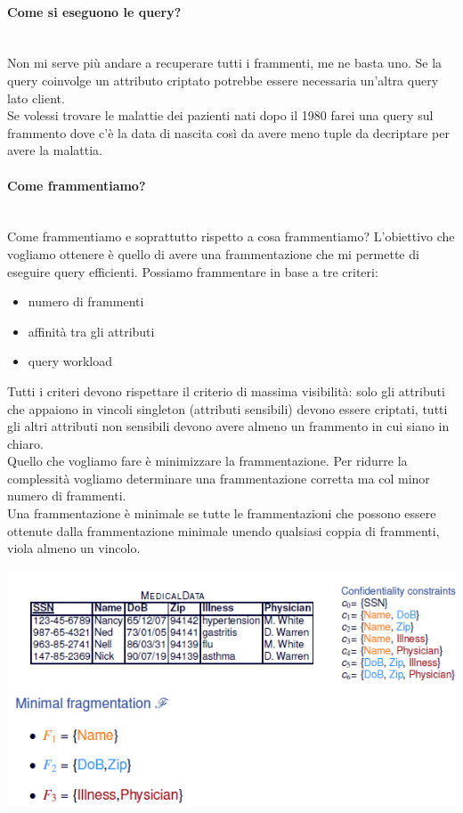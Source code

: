 \paragraph{Come si eseguono le query?}\\
Non mi serve più andare a recuperare tutti i frammenti, me ne basta uno. Se la query coinvolge un attributo criptato potrebbe essere necessaria un'altra query lato client.\\
Se volessi trovare le malattie dei pazienti nati dopo il 1980 farei una query sul frammento dove c'è la data di nascita così da avere meno tuple da decriptare per avere la malattia.

\paragraph{Come frammentiamo?}\\ Come frammentiamo e soprattutto rispetto a cosa frammentiamo? L'obiettivo che vogliamo ottenere è quello di avere una frammentazione che mi permette di eseguire query efficienti. Possiamo frammentare in base a tre criteri:
\begin{itemize}
    \item numero di frammenti
    \item affinità tra gli attributi
    \item query workload
\end{itemize}
Tutti i criteri devono rispettare il criterio di massima visibilità: solo gli attributi che appaiono in vincoli singleton (attributi sensibili) devono essere criptati, tutti gli altri attributi non sensibili devono avere almeno un frammento in cui siano in chiaro.\\
Quello che vogliamo fare è minimizzare la frammentazione. Per ridurre la complessità vogliamo determinare una frammentazione corretta ma col minor numero di frammenti.\\
Una frammentazione è minimale se tutte le frammentazioni che possono essere ottenute dalla frammentazione minimale unendo qualsiasi coppia di frammenti, viola almeno un vincolo.
\begin{center}
    \includegraphics[scale=0.7]{img/fragment.png}
\end{center}
